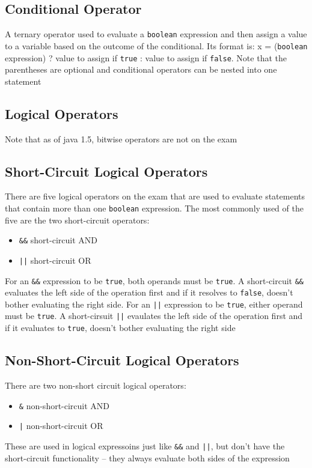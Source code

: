 \subsection{Conditional Operator}
A ternary operator used to evaluate a \verb#boolean# expression and then assign 
a value to a variable based on the outcome of the conditional. Its format is: x 
= (\verb#boolean# expression) ? value to assign if \verb#true# : value to 
assign if \verb#false#. Note that the parentheses are optional and conditional 
operators can be nested into one statement

\subsection{Logical Operators}
Note that as of java 1.5, bitwise operators are not on the exam

\subsection{Short-Circuit Logical Operators}
There are five logical operators on the exam that are used to evaluate 
statements that contain more than one \verb#boolean# expression. The most 
commonly used of the five are the two short-circuit operators:
\begin{itemize}
    \item \verb#&&# short-circuit AND
    \item \verb#||# short-circuit OR
\end{itemize}
For an \verb#&&# expression to be \verb#true#, both operands must be 
\verb#true#. A short-circuit \verb#&&# evaluates the left side of the operation 
first and if it resolves to \verb#false#, doesn't bother evaluating the right 
side. For an \verb#||# expression to be \verb#true#, either operand must be 
\verb#true#. A short-cirsuit \verb#||# evaulates the left side of the operation 
first and if it evaluates to \verb#true#, doesn't bother evaluating the right 
side

\subsection{Non-Short-Circuit Logical Operators}
There are two non-short circuit logical operators:
\begin{itemize}
    \item \verb#&# non-short-circuit AND
    \item \verb#|# non-short-circuit OR
\end{itemize}
These are used in logical expressoins just like \verb#&&# and \verb#||#, but 
don't have the short-circuit functionality -- they always evaluate both sides 
of the expression

